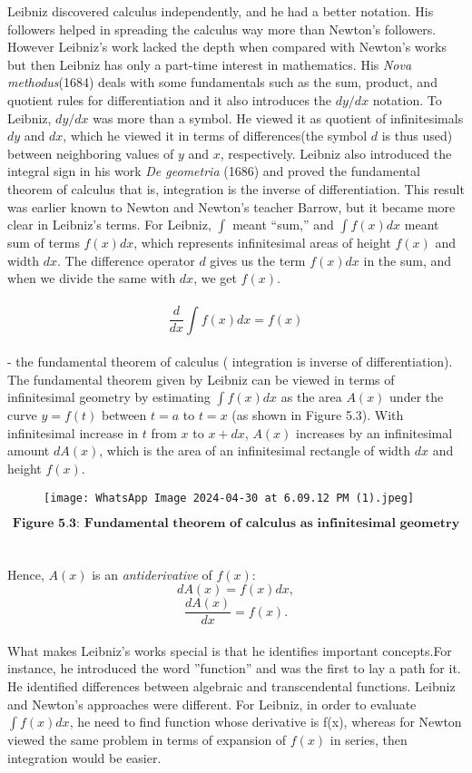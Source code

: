 \documentclass[a4paper,reqno,11pt]{amsart}
\theoremstyle{plain}%
\begin{document}
\indent Leibniz discovered calculus independently, and he had a better notation. His followers helped in spreading the calculus way more than Newton's followers. However Leibniz’s work lacked the depth when compared with Newton's works but then Leibniz has only a part-time interest in mathematics. His \textit{Nova methodus}(1684) deals with some fundamentals such as the sum, product, and quotient rules for differentiation and it also introduces the $dy/dx$ notation. To Leibniz, $dy/dx$ was more than a symbol. He viewed it as quotient of infinitesimals $dy$ and $dx$, which he viewed it in terms of differences(the symbol $d$ is thus used) between neighboring values of $y$ and $x$, respectively.
Leibniz also introduced the integral sign in his work \textit{De geometria} (1686) and
proved the fundamental theorem of calculus that is, integration is the inverse
of differentiation. This result was earlier known to Newton and Newton’s teacher Barrow, but it became more clear in Leibniz's terms. For Leibniz, $\int$ meant “sum,” and $\int f(x) dx$ meant sum of terms $f(x)dx$, which represents infinitesimal areas of height
$f(x)$ and width $dx$. The difference operator $d$ gives us the term $f(x) dx$
in the sum, and when we divide the same with $dx$, we get $f(x)$. \\
\\
$$\frac{d}{dx}\int f(x) dx = f(x)$$\\
- the fundamental theorem of calculus ( integration is inverse of differentiation).
The fundamental theorem given by Leibniz can be viewed in terms of infinitesimal geometry by estimating $\int f(x) dx$ as the area $A(x)$ under the curve $y = f(t)$
between $t = a$ to $t = x$ (as shown in Figure 5.3). With infinitesimal increase in $t$ from $x$ to $x + dx$, $A(x)$ increases by an infinitesimal amount $dA(x)$, which is the area of an infinitesimal rectangle of width $dx$ and height $f(x)$.
\begin{figure}
\texttt{[image: WhatsApp Image 2024-04-30 at 6.09.12 PM (1).jpeg]}
\end{figure}
$$\textbf{Figure 5.3: Fundamental theorem of calculus as infinitesimal geometry}$$
\\
\\
Hence, $A(x)$ is an \textit{antiderivative} of $f(x)$:\\
$$dA(x) = f(x)dx,$$
$$\frac{dA(x)}{dx} = f(x).$$
\\
What makes Leibniz's works special is that he identifies important concepts.For instance, he introduced the word ''function” and was the first to lay a path for it. He identified differences between algebraic and transcendental functions. Leibniz and Newton's approaches were different. For Leibniz, in order to evaluate $\int f(x) dx$, he need to find function whose derivative is f(x), whereas for Newton viewed the same problem in terms of expansion of $f(x)$ in series, then integration would be easier.\\
\end{document}
